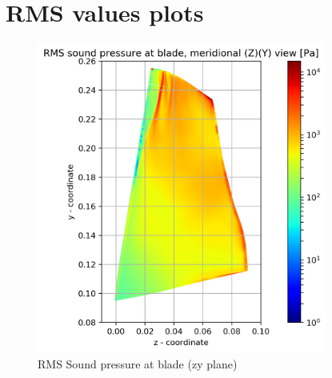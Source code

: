 
\chapter{RMS values plots} %

\label{rms_results} %


\begin{figure}[ht]
	\centering
	\includegraphics[width=0.85\textwidth]{Figures/blade-zy-rms-spl.png}
    \caption{RMS Sound pressure at blade (zy plane)} \label{blade-zy-rms-spl}
\end{figure}	

